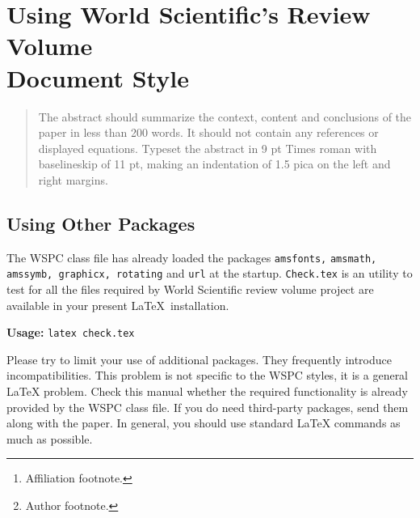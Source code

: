 \documentclass{ws-rv9x6}
\begin{document}
\chapter[Using World Scientific's Review Volume Document Style]{Using World Scientific's Review Volume\\ Document Style\label{ra_ch1}}

\author[F. Author and S. Author]{First Author and Second Author\footnote{Author footnote.}}

\address{World Scientific Publishing Co, Production Department,\\
5 Toh Tuck Link, Singapore 596224, \\
f\_author@wspc.com.sg\footnote{Affiliation footnote.}}

\begin{abstract}
The abstract should summarize the context, content and conclusions of
the paper in less than 200 words. It should not contain any references
or displayed equations. Typeset the abstract in 9 pt Times roman with
baselineskip of 11 pt, making an indentation of 1.5 pica on the left
and right margins.
\end{abstract}


\body


\section{Using Other Packages}\label{ra_sec1}
The WSPC class file has already loaded the packages \verb|amsfonts,|
\verb|amsmath, amssymb, graphicx, rotating| and \verb|url| at the
startup. \verb|Check.tex| is an utility to test for all the files
required by World Scientific review volume project are available in
your present \LaTeX\ installation.

{\bf Usage:} \verb|latex check.tex|

Please try to limit your use of additional packages. They frequently
introduce incompatibilities. This problem is not specific to the
WSPC styles, it is a general \LaTeX{} problem. Check this manual
whether the required functionality is already provided by the WSPC
class file. If you do need third-party packages, send them along
with the paper. In general, you should use standard \LaTeX{}
commands as much as possible.
\end{document}
